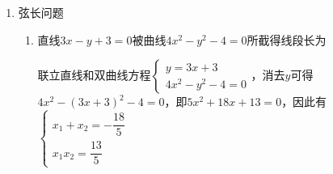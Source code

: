 \begin{enumerate}
\begin{enumerate}
\begin{jieda}
            联立直线和双曲线方程有$\left\{\begin{array}{l}
                 y = 2x-1  \\
                 {x}^{2} - \dfrac{{y}^{2}}{2} = 1
            \end{array}\right.$，消去$y$可得$2x^2-(2x-1)^2 = 2$，即$-2x^2+4x-3=0$，方程无解，故不存在.
        \end{jieda}
    
        \item 设 $A,B$ 为双曲线 ${x}^{2} - \dfrac{{y}^{2}}{9} = 1$ 上两点,下列四个点中,可为线段 ${AB}$ 中点的是
        \begin{jieda}
            弦中点不会位于双曲线和渐近线中间的区域. 不利用结论可以点差法逐一求出直线方程检验.
        \end{jieda}
        
        \item 已知双曲线 $C : \dfrac{{x}^{2}}{{a}^{2}} - \dfrac{{y}^{2}}{{b}^{2}} = 1\left( {a > 0,b > 0}\right)$ ,若双曲线上不存在以点$(2a, a)$为中点的弦,则双曲线离心率 $e$ 的取值范围是
        \begin{jieda}
            $\dfrac{4{a}^{2}}{{a}^{2}} - \dfrac{a^{2}}{{b}^{2}} \in [0, 1]$，即$\dfrac{a^{2}}{{b}^{2}} \in [3, 4]$，故$e \in \left\lbrack  {\dfrac{\sqrt{5}}{2},\dfrac{2\sqrt{3}}{3}}\right\rbrack$
        \end{jieda}
    \end{enumerate}
    \item 弦长问题
    \begin{enumerate}
        \item 直线$3x-y+3=0$被曲线$4x^2-y^2-4 = 0$所截得线段长为
        \begin{jieda}
            联立直线和双曲线方程$\left\{\begin{array}{l}
                 y = 3x+3 \\
                 4x^2-y^2-4 = 0
            \end{array}\right.$，消去$y$可得$4x^2-(3x+3)^2-4 = 0$，即$5x^2+18x+13 = 0$，因此有$\left\{\begin{array}{l}
                 x_1+x_2 = -\dfrac{18}{5} \\
                 x_1x_2 = \dfrac{13}{5}
            \end{array}\right.$


\end{jieda}
\end{enumerate}
\end{enumerate}
